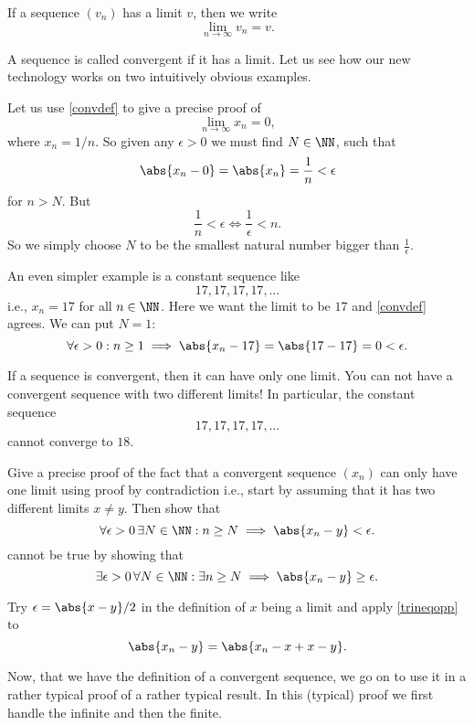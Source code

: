 \documentclass{article}
\begin{document}
If a sequence $(v_n)$ has a limit $v$, then we write
$$
\lim_{n\to\infty} v_n = v.
$$

A sequence is called convergent if it has a limit. Let us see
how our new technology works on two intuitively
obvious examples.





\begin{example}\label{Example:basicconv}
  Let us use \eqref{convdef} to give a precise proof of
  $$
  \lim_{n\to\infty} x_n = 0,
  $$
  where $x_n = 1/n$. So given any $\epsilon >0$ we must find $N\in \NN$, such that
  $$
  \abs{x_n - 0} = \abs{x_n} = \frac{1}{n} < \epsilon
  $$
  for $n > N$. But
  $$
  \frac{1}{n} < \epsilon \iff \frac{1}{\epsilon} < n.
  $$
  So we simply choose $N$ to be the smallest natural number bigger than $\frac{1}{\epsilon}$.

  An even simpler example is a constant sequence like
  $$
  17, 17, 17, 17, \dots
  $$
  i.e., $x_n = 17$ for all $n\in \NN$. Here we want the limit to be $17$ and
  \eqref{convdef} agrees. We can put $N= 1$:
  $$
  \forall \epsilon > 0 : n\geq 1\implies \abs{x_n - 17} = \abs{17 - 17} = 0 < \epsilon.
  $$

\end{example}


If a sequence is convergent, then it can have
only one limit. You can not have a convergent sequence with two different limits!
In particular, the constant sequence
$$
  17, 17, 17, 17, \dots
  $$
  cannot converge to $18$.

\beginshex
Give a precise proof of the fact that a convergent sequence $(x_n)$ can only have
one limit using proof by contradiction i.e., start by assuming that
it has two different limits $x\neq y$. Then show that 
$$
\forall \epsilon > 0\, \exists N\in \NN: n\geq N\implies \abs{x_n - y} < \epsilon.
$$
cannot be true by showing that
$$
\exists \epsilon > 0\, \forall N\in \NN: \exists n\geq N\implies \abs{x_n - y} \geq \epsilon.
$$
\begin{hint}
  Try $\epsilon = \abs{x-y}/2$ in the definition of $x$ being a limit and apply \eqref{trineqopp} to
  $$
  \abs{x_n - y} = \abs{x_n - x + x - y}.
  $$
\end{hint}
\endshex

Now, that we have the definition of a convergent sequence, we go on to use it in a rather
typical proof of a rather typical result. In this (typical) proof we first handle the
infinite and then the finite.
\end{document}

